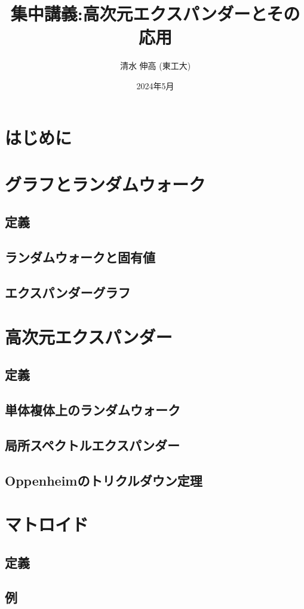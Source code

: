 \documentclass[11pt]{article}
\title{集中講義:高次元エクスパンダーとその応用}
\author{清水 伸高 (東工大)}
\date{2024年5月}
\begin{document}
\maketitle
\tableofcontents
\section{はじめに}
\section{グラフとランダムウォーク}
\subsection{定義}
\subsection{ランダムウォークと固有値}
\subsection{エクスパンダーグラフ}

\section{高次元エクスパンダー}
\subsection{定義}
\subsection{単体複体上のランダムウォーク}
\subsection{局所スペクトルエクスパンダー}
\subsection{Oppenheimのトリクルダウン定理}

\section{マトロイド}
\subsection{定義}
\subsection{例}
\end{document}
